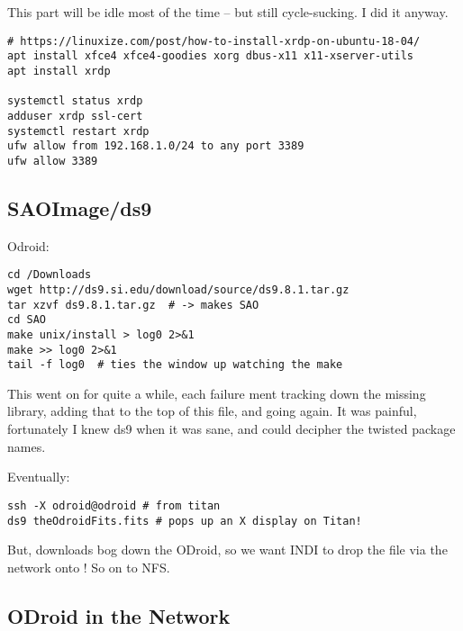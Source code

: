\documentclass[letter,11pt,oneside]{article}
\newcommand{\dhl}[1]{{\color{verbcolor}{\texttt#1}}}
\begin{document}
This part will be idle most of the time -- but still cycle-sucking.
I did it anyway.


\begin{tcolorbox} %
\begingroup \fontsize{10pt}{10pt}
\selectfont
\begin{verbatim} 
# https://linuxize.com/post/how-to-install-xrdp-on-ubuntu-18-04/
apt install xfce4 xfce4-goodies xorg dbus-x11 x11-xserver-utils
apt install xrdp 

systemctl status xrdp
adduser xrdp ssl-cert  
systemctl restart xrdp
ufw allow from 192.168.1.0/24 to any port 3389
ufw allow 3389
\end{verbatim}
\endgroup
\end{tcolorbox}

\subsection{SAOImage/ds9}  \label{sec:ds9}

Odroid:

\begin{tcolorbox} %
\begingroup \fontsize{10pt}{10pt}
\selectfont
\begin{verbatim} 
cd /Downloads
wget http://ds9.si.edu/download/source/ds9.8.1.tar.gz
tar xzvf ds9.8.1.tar.gz  # -> makes SAO
cd SAO
make unix/install > log0 2>&1
make >> log0 2>&1
tail -f log0  # ties the window up watching the make
\end{verbatim}
\endgroup
\end{tcolorbox}

This went on for quite a while, each failure ment tracking
down the missing library, adding that to the top of
this file, and going again. It was painful, fortunately
I knew ds9 when it was sane, and could decipher the
twisted package names.

Eventually:

\begin{tcolorbox} %
\begingroup \fontsize{10pt}{10pt}
\selectfont
\begin{verbatim} 
ssh -X odroid@odroid # from titan
ds9 theOdroidFits.fits # pops up an X display on Titan!
\end{verbatim}
\endgroup
\end{tcolorbox}
But, downloads bog down the ODroid, so we want INDI to
drop the file via the network onto \dhl{titan}! So
on to NFS.


\subsection{ODroid in the Network}  \label{sec:networking}
\end{document}
